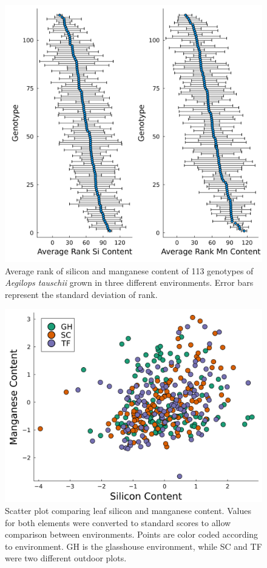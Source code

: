 \documentclass[12pt, letterpaper]{report}
\begin{document}
\begin{figure}[h]
        \includegraphics[width = \textwidth]{images/rank_plots.png}
        \centering
        \caption{Average rank of silicon and manganese content of 113 genotypes of \textit{Aegilops tauschii} grown in three different environments. Error bars represent the standard deviation of rank.}
        \label{Fig:rank_plots}
\end{figure}

\begin{figure}[h]
        \includegraphics[scale=0.048]{images/si_mn_regression.png}
        \centering
        \caption{Scatter plot comparing leaf silicon and manganese content. Values for both elements were converted to standard scores to allow
        comparison between environments. Points are color coded according to environment. GH is the glasshouse environment, while SC and TF were two different outdoor plots.}
        \label{Fig:mn_si_regression}
\end{figure}
\end{document}
